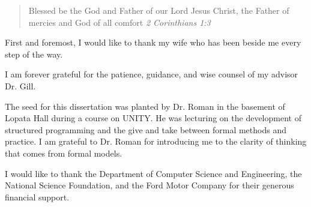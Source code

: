\documentclass[phdthesis,12pt]{wuthesis}
\begin{document}
\VerbatimFootnotes

\frontmatter
\begin{thesistitlepage}
\end{thesistitlepage}

\begin{thesiscopyrightpage}
\end{thesiscopyrightpage}

\begin{singlespace}
\setcounter{page}{2}
\tableofcontents
\listoftables
\listoffigures
\end{singlespace}

\begin{thesisacknowledgments}

\begin{quote}
Blessed be the God and Father of our Lord Jesus Christ, the Father of mercies and God of all comfort  \emph{2 Corinthians 1:3}
\end{quote}

First and foremost, I would like to thank my wife who has been beside me every step of the way.

I am forever grateful for the patience, guidance, and wise counsel of my advisor Dr. Gill.

The seed for this dissertation was planted by Dr. Roman in the basement of Lopata Hall during a course on UNITY.
He was lecturing on the development of structured programming and the give and take between formal methods and practice.
I am grateful to Dr. Roman for introducing me to the clarity of thinking that comes from formal models.

I would like to thank the Department of Computer Science and Engineering, the National Science Foundation, and the Ford Motor Company for their generous financial support.

\end{thesisacknowledgments}

\end{document}
